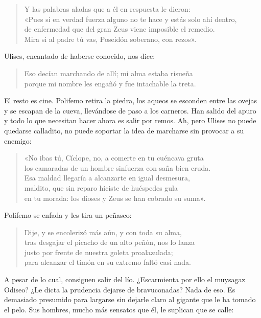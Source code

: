\documentclass[11pt,a4paper]{article}
\begin{document}
\begin{verse}
Y las palabras aladas que a él en respuesta le dieron:\\
«Pues si en verdad fuerza alguno no te hace y estás solo ahí dentro,\\
de enfermedad que del gran Zeus viene imposible el remedio.\\
Mira si al padre tú vas, Poseidón soberano, con rezos».
\end{verse}

Ulises, encantado de haberse conocido, nos dice:

\begin{verse}
Eso decían marchando de allí; mi alma estaba risueña\\
porque mi nombre les engañó y fue intachable la treta.
\end{verse}

El resto es cine. Polifemo retira la piedra, los aqueos se esconden entre las ovejas y se escapan de la cueva, llevándose de paso a los carneros. Han salido del apuro y todo lo que necesitan hacer ahora es salir por remos. Ah, pero Ulises no puede quedarse calladito, no puede soportar la idea de marcharse sin provocar a su enemigo:

\begin{verse}
«No ibas tú, Cíclope, no, a comerte en tu cuéncava gruta\\
los camaradas de un hombre sinfuerza con saña bien cruda.\\
Esa maldad llegaría a alcanzarte en igual desmesura,\\
maldito, que sin reparo hiciste de huéspedes gula\\
en tu morada: los dioses y Zeus se han cobrado su suma».
\end{verse}

Polifemo se enfada y les tira un peñasco:

\begin{verse}
Dije, y se encolerizó más aún, y con toda su alma,\\
tras desgajar el picacho de un alto peñón, nos lo lanza\\
justo por frente de nuestra goleta proalazulada;\\
para alcanzar el timón en su extremo faltó casi nada.
\end{verse}

A pesar de lo cual, consiguen salir del lío. ¿Escarmienta por ello el muysagaz Odiseo? ¿Le dicta la prudencia dejarse de bravuconadas? Nada de eso. Es demasiado presumido para largarse sin dejarle claro al gigante que le ha tomado el pelo.
Sus hombres, mucho más sensatos que él, le suplican que se calle:
\end{document}

